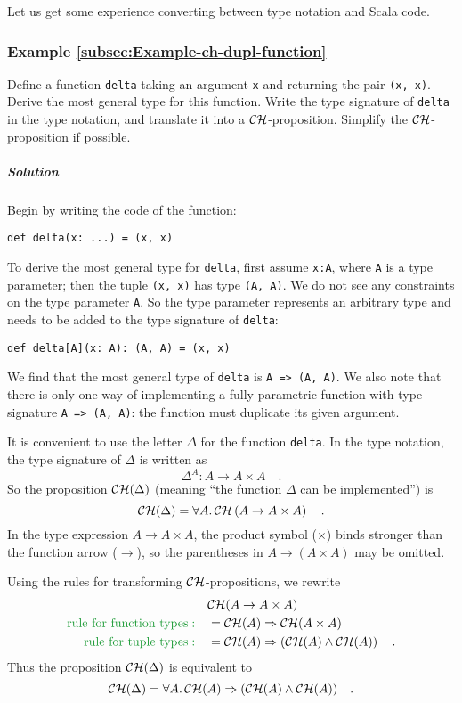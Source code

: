 Let us get some experience converting between type notation and Scala
code.

\subsubsection{Example \label{subsec:Example-ch-dupl-function}\ref{subsec:Example-ch-dupl-function}}

Define a function \lstinline!delta! taking an argument \lstinline!x!
and returning the pair \lstinline!(x, x)!. Derive the most general
type for this function. Write the type signature of \lstinline!delta!
in the type notation, and translate it into a ${\cal CH}$-proposition.
Simplify the ${\cal CH}$-proposition if possible.

\subparagraph{Solution}

Begin by writing the code of the function:
\begin{lstlisting}
def delta(x: ...) = (x, x)
\end{lstlisting}
To derive the most general type for \lstinline!delta!, first assume
\lstinline!x:A!, where \lstinline!A! is a type parameter; then the
tuple \lstinline!(x, x)! has type \lstinline!(A, A)!. We do not
see any constraints on the type parameter \lstinline!A!. So the type
parameter represents an arbitrary type and needs to be added to the
type signature of \lstinline!delta!:
\begin{lstlisting}
def delta[A](x: A): (A, A) = (x, x)
\end{lstlisting}
We find that the most general type of \lstinline!delta! is \lstinline!A => (A, A)!.
We also note that there is only one way of implementing a fully parametric
function with type signature \lstinline!A => (A, A)!: the function
must duplicate its given argument.

It is convenient to use the letter $\Delta$ for the function \lstinline!delta!.
In the type notation, the type signature of $\Delta$ is written as
\[
\Delta^{A}:A\rightarrow A\times A\quad.
\]
So the proposition ${\cal CH}(\Delta)$ (meaning \textsf{``}the function $\Delta$
can be implemented\textsf{''}) is
\[
{\cal CH}(\Delta)=\forall A.{\cal \,CH}\left(A\rightarrow A\times A\right)\quad.
\]
In the type expression $A\rightarrow A\times A$, the product symbol
($\times$) binds stronger than the function arrow ($\rightarrow$),
so the parentheses in $A\rightarrow\left(A\times A\right)$ may be
omitted.

Using the rules for transforming ${\cal CH}$-propositions, we rewrite
\begin{align*}
 & {\cal CH}(A\rightarrow A\times A)\\
{\color{greenunder}\text{rule for function types}:}\quad & ={\cal CH}(A)\Rightarrow{\cal CH}(A\times A)\\
{\color{greenunder}\text{rule for tuple types}:}\quad & ={\cal CH}(A)\Rightarrow\left({\cal CH}(A)\wedge{\cal CH}(A)\right)\quad.
\end{align*}
Thus the proposition ${\cal CH}(\Delta)$ is equivalent to
\[
{\cal CH}(\Delta)=\forall A.\,{\cal CH}(A)\Rightarrow({\cal CH}(A)\wedge{\cal CH}(A))\quad.
\]


